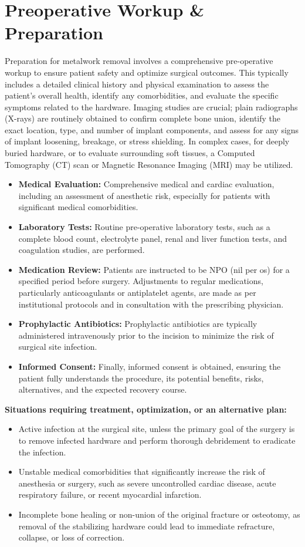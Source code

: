 \section*{Preoperative Workup \& Preparation}
Preparation for metalwork removal involves a comprehensive pre-operative workup to ensure patient safety and optimize surgical outcomes. This typically includes a detailed clinical history and physical examination to assess the patient's overall health, identify any comorbidities, and evaluate the specific symptoms related to the hardware. Imaging studies are crucial; plain radiographs (X-rays) are routinely obtained to confirm complete bone union, identify the exact location, type, and number of implant components, and assess for any signs of implant loosening, breakage, or stress shielding. In complex cases, for deeply buried hardware, or to evaluate surrounding soft tissues, a Computed Tomography (CT) scan or Magnetic Resonance Imaging (MRI) may be utilized.

\begin{itemize}
  \item \textbf{Medical Evaluation:} Comprehensive medical and cardiac evaluation, including an assessment of anesthetic risk, especially for patients with significant medical comorbidities.
  \item \textbf{Laboratory Tests:} Routine pre-operative laboratory tests, such as a complete blood count, electrolyte panel, renal and liver function tests, and coagulation studies, are performed.
  \item \textbf{Medication Review:} Patients are instructed to be NPO (nil per os) for a specified period before surgery. Adjustments to regular medications, particularly anticoagulants or antiplatelet agents, are made as per institutional protocols and in consultation with the prescribing physician.
  \item \textbf{Prophylactic Antibiotics:} Prophylactic antibiotics are typically administered intravenously prior to the incision to minimize the risk of surgical site infection.
  \item \textbf{Informed Consent:} Finally, informed consent is obtained, ensuring the patient fully understands the procedure, its potential benefits, risks, alternatives, and the expected recovery course.
\end{itemize}

\textbf{Situations requiring treatment, optimization, or an alternative plan:}
\begin{itemize}
  \item Active infection at the surgical site, unless the primary goal of the surgery is to remove infected hardware and perform thorough debridement to eradicate the infection.
  \item Unstable medical comorbidities that significantly increase the risk of anesthesia or surgery, such as severe uncontrolled cardiac disease, acute respiratory failure, or recent myocardial infarction.
  \item Incomplete bone healing or non-union of the original fracture or osteotomy, as removal of the stabilizing hardware could lead to immediate refracture, collapse, or loss of correction.
\end{itemize}

